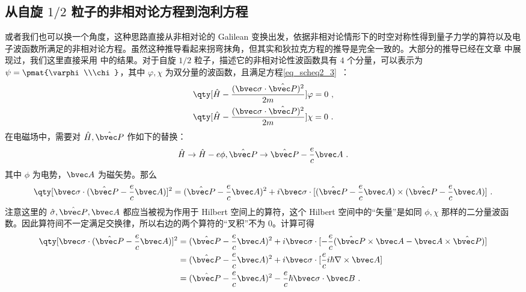 \subsection{从自旋 $1/2$ 粒子的非相对论方程到泡利方程}
或者我们也可以换一个角度，这种思路直接从非相对论的 Galilean 变换出发\cite{刘觉平}，依据非相对论情形下的时空对称性得到量子力学的算符以及电子波函数所满足的非相对论方程。虽然这种推导看起来拐弯抹角，但其实和狄拉克方程的推导是完全一致的。大部分的推导已经在文章  中展现过，我们这里直接采用 中的结果。对于自旋 $1/2$ 粒子，描述它的非相对论性波函数具有 $4$ 个分量，可以表示为 $\psi=\pmat{\varphi\\\chi}$，其中 $\varphi,\chi$ 为双分量的波函数，且满足方程\autoref{eq_scheq2_3}~：
\begin{equation}
\begin{aligned}
&\qty[\hat H-\frac{(\bvec \sigma\cdot \hat{\bvec P})^2}{2m}]\varphi=0~,\\
&
\qty[\hat H-\frac{(\bvec \sigma\cdot \hat{\bvec P})^2}{2m}]\chi=0~.
\end{aligned}
\end{equation}
在电磁场中，需要对 $\hat H,\hat{\bvec P}$ 作如下的替换：
\begin{equation}
\hat H\rightarrow \hat H-e\phi, \hat{\bvec P}\rightarrow \hat{\bvec P}-\frac{e}{c}\bvec A~.
\end{equation}
其中 $\phi$ 为电势，$\bvec A$ 为磁矢势。那么
\begin{equation}\label{eq_Pauli_1}
\qty[\bvec \sigma\cdot(\hat{\bvec P}-\frac{e}{c}\bvec A)]^2=(\hat{\bvec P}-\frac{e}{c}\bvec A)^2+i\bvec \sigma\cdot[(\hat{\bvec P}-\frac{e}{c}\bvec A)\times (\hat{\bvec P}-\frac{e}{c}\bvec A)]~.
\end{equation}
注意这里的 $\hat \sigma,\hat{\bvec P},\bvec A$ 都应当被视为作用于 Hilbert 空间上的算符，这个 Hilbert 空间中的“矢量”是如同 $\phi,\chi$ 那样的二分量波函数。因此算符间不一定满足交换律，所以右边的两个算符的“叉积”不为 $0$。计算可得
\begin{equation}
\begin{aligned}
\qty[\bvec \sigma \cdot (\hat{\bvec P}-\frac{e}{c}\bvec A)]^2
&=(\hat{\bvec P}-\frac{e}{c}\bvec A)^2+i\bvec \sigma\cdot[-\frac{e}{c}(\hat{\bvec P}\times \bvec A- \bvec A\times \hat{\bvec P})]\\
&=(\hat{\bvec P}-\frac{e}{c}\bvec A)^2+i\bvec \sigma\cdot[\frac{e}{c}i\hbar \nabla \times  \bvec A]\\
&=(\hat{\bvec P}-\frac{e}{c}\bvec A)^2-\frac{e}{c}\hbar\bvec \sigma\cdot \bvec B~.
\end{aligned}
\end{equation}
